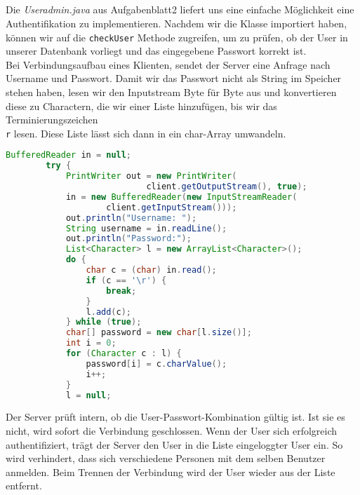 \documentclass{scrartcl}
\begin{document}
    \subsection{}
    \label{sub:5.4}
      Die \textit{Useradmin.java} aus Aufgabenblatt2 liefert uns eine einfache
      Möglichkeit eine Authentifikation zu implementieren. Nachdem wir die
      Klasse importiert haben, können wir auf die \texttt{checkUser} Methode
      zugreifen, um zu prüfen, ob der User in unserer Datenbank vorliegt und
      das eingegebene Passwort korrekt ist.\\
      Bei Verbindungsaufbau eines Klienten, sendet der Server eine Anfrage nach
      Username und Passwort. Damit wir das Passwort nicht als String im
      Speicher stehen haben, lesen wir den Inputstream Byte für Byte aus und
      konvertieren diese zu Charactern, die wir einer Liste hinzufügen, bis wir
      das Terminierungszeichen \texttt{\\r} lesen. Diese Liste lässt sich dann
      in ein char-Array umwandeln.
      \begin{lstlisting}[language=java]
        BufferedReader in = null;
		try {
			PrintWriter out = new PrintWriter(
                            client.getOutputStream(), true);
			in = new BufferedReader(new InputStreamReader(
					client.getInputStream()));
			out.println("Username: ");
			String username = in.readLine();
			out.println("Password:");
			List<Character> l = new ArrayList<Character>();
			do {
				char c = (char) in.read();
				if (c == '\r') {
					break;
				}
				l.add(c);
			} while (true);
			char[] password = new char[l.size()];
			int i = 0;
			for (Character c : l) {
				password[i] = c.charValue();
				i++;
			}
			l = null;
      \end{lstlisting}
      Der Server prüft intern, ob die User-Passwort-Kombination gültig ist.
      Ist sie es nicht, wird sofort die Verbindung geschlossen. Wenn der User
      sich erfolgreich authentifiziert, trägt der Server den User in die Liste
      eingeloggter User ein. So wird verhindert, dass sich verschiedene Personen
      mit dem selben Benutzer anmelden. Beim Trennen der Verbindung wird der
      User wieder aus der Liste entfernt.
      \newpage
\end{document}
